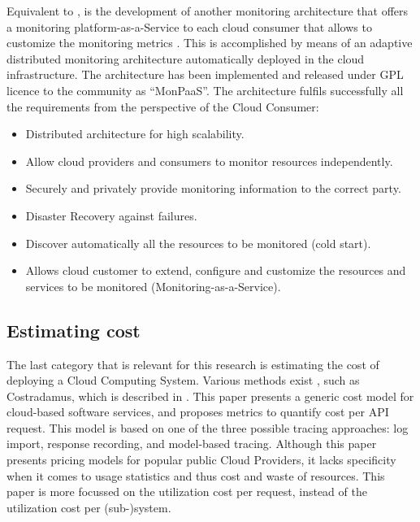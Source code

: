 \noindent
Equivalent to \cite{aktas2018hybrid}, is the development of another monitoring architecture that offers a monitoring platform-as-a-Service to each cloud consumer that allows to customize the monitoring metrics \cite{calero2014monpaas}. This is accomplished by means of an adaptive distributed monitoring architecture automatically deployed in the cloud infrastructure. The architecture has been implemented and released under GPL licence to the community as ``MonPaaS''. The architecture fulfils successfully all the requirements from the perspective of the Cloud Consumer:
\begin{itemize}
    \item Distributed architecture for high scalability.
    \item Allow cloud providers and consumers to monitor resources independently.
    \item Securely and privately provide monitoring information to the correct party.
    \item Disaster Recovery against failures.
    \item Discover automatically all the resources to be monitored (cold start).
    \item Allows cloud customer to extend, configure and customize the resources and services to be monitored (Monitoring-as-a-Service).
\end{itemize}

\subsection{Estimating cost} \label{sec:estimating_cost}
The last category that is relevant for this research is estimating the cost of deploying a Cloud Computing System. Various methods exist \cite{li2009method, leitner2016modelling}, such as Costradamus, which is described in \cite{kuhlenkamp2017costradamus}. This paper presents a generic cost model for cloud-based software services, and proposes metrics to quantify cost per API request. This model is based on one of the three possible tracing approaches: log import, response recording, and model-based tracing. Although this paper presents pricing models for popular public Cloud Providers, it lacks specificity when it comes to usage statistics and thus cost and waste of resources. This paper is more focussed on the utilization cost per request, instead of the utilization cost per (sub-)system.\\

